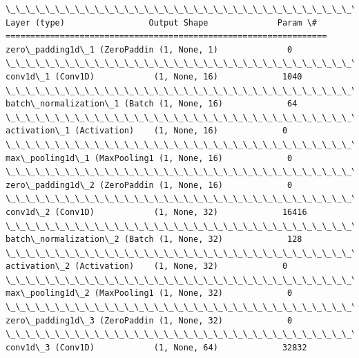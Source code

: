 \documentclass[11pt]{article}
\begin{document}
    \begin{Verbatim}[commandchars=\\\{\}]
\_\_\_\_\_\_\_\_\_\_\_\_\_\_\_\_\_\_\_\_\_\_\_\_\_\_\_\_\_\_\_\_\_\_\_\_\_\_\_\_\_\_\_\_\_\_\_\_\_\_\_\_\_\_\_\_\_\_\_\_\_\_\_\_\_
Layer (type)                 Output Shape              Param \#   
=================================================================
zero\_padding1d\_1 (ZeroPaddin (1, None, 1)              0         
\_\_\_\_\_\_\_\_\_\_\_\_\_\_\_\_\_\_\_\_\_\_\_\_\_\_\_\_\_\_\_\_\_\_\_\_\_\_\_\_\_\_\_\_\_\_\_\_\_\_\_\_\_\_\_\_\_\_\_\_\_\_\_\_\_
conv1d\_1 (Conv1D)            (1, None, 16)             1040      
\_\_\_\_\_\_\_\_\_\_\_\_\_\_\_\_\_\_\_\_\_\_\_\_\_\_\_\_\_\_\_\_\_\_\_\_\_\_\_\_\_\_\_\_\_\_\_\_\_\_\_\_\_\_\_\_\_\_\_\_\_\_\_\_\_
batch\_normalization\_1 (Batch (1, None, 16)             64        
\_\_\_\_\_\_\_\_\_\_\_\_\_\_\_\_\_\_\_\_\_\_\_\_\_\_\_\_\_\_\_\_\_\_\_\_\_\_\_\_\_\_\_\_\_\_\_\_\_\_\_\_\_\_\_\_\_\_\_\_\_\_\_\_\_
activation\_1 (Activation)    (1, None, 16)             0         
\_\_\_\_\_\_\_\_\_\_\_\_\_\_\_\_\_\_\_\_\_\_\_\_\_\_\_\_\_\_\_\_\_\_\_\_\_\_\_\_\_\_\_\_\_\_\_\_\_\_\_\_\_\_\_\_\_\_\_\_\_\_\_\_\_
max\_pooling1d\_1 (MaxPooling1 (1, None, 16)             0         
\_\_\_\_\_\_\_\_\_\_\_\_\_\_\_\_\_\_\_\_\_\_\_\_\_\_\_\_\_\_\_\_\_\_\_\_\_\_\_\_\_\_\_\_\_\_\_\_\_\_\_\_\_\_\_\_\_\_\_\_\_\_\_\_\_
zero\_padding1d\_2 (ZeroPaddin (1, None, 16)             0         
\_\_\_\_\_\_\_\_\_\_\_\_\_\_\_\_\_\_\_\_\_\_\_\_\_\_\_\_\_\_\_\_\_\_\_\_\_\_\_\_\_\_\_\_\_\_\_\_\_\_\_\_\_\_\_\_\_\_\_\_\_\_\_\_\_
conv1d\_2 (Conv1D)            (1, None, 32)             16416     
\_\_\_\_\_\_\_\_\_\_\_\_\_\_\_\_\_\_\_\_\_\_\_\_\_\_\_\_\_\_\_\_\_\_\_\_\_\_\_\_\_\_\_\_\_\_\_\_\_\_\_\_\_\_\_\_\_\_\_\_\_\_\_\_\_
batch\_normalization\_2 (Batch (1, None, 32)             128       
\_\_\_\_\_\_\_\_\_\_\_\_\_\_\_\_\_\_\_\_\_\_\_\_\_\_\_\_\_\_\_\_\_\_\_\_\_\_\_\_\_\_\_\_\_\_\_\_\_\_\_\_\_\_\_\_\_\_\_\_\_\_\_\_\_
activation\_2 (Activation)    (1, None, 32)             0         
\_\_\_\_\_\_\_\_\_\_\_\_\_\_\_\_\_\_\_\_\_\_\_\_\_\_\_\_\_\_\_\_\_\_\_\_\_\_\_\_\_\_\_\_\_\_\_\_\_\_\_\_\_\_\_\_\_\_\_\_\_\_\_\_\_
max\_pooling1d\_2 (MaxPooling1 (1, None, 32)             0         
\_\_\_\_\_\_\_\_\_\_\_\_\_\_\_\_\_\_\_\_\_\_\_\_\_\_\_\_\_\_\_\_\_\_\_\_\_\_\_\_\_\_\_\_\_\_\_\_\_\_\_\_\_\_\_\_\_\_\_\_\_\_\_\_\_
zero\_padding1d\_3 (ZeroPaddin (1, None, 32)             0         
\_\_\_\_\_\_\_\_\_\_\_\_\_\_\_\_\_\_\_\_\_\_\_\_\_\_\_\_\_\_\_\_\_\_\_\_\_\_\_\_\_\_\_\_\_\_\_\_\_\_\_\_\_\_\_\_\_\_\_\_\_\_\_\_\_
conv1d\_3 (Conv1D)            (1, None, 64)             32832     

\end{Verbatim}
\end{document}
